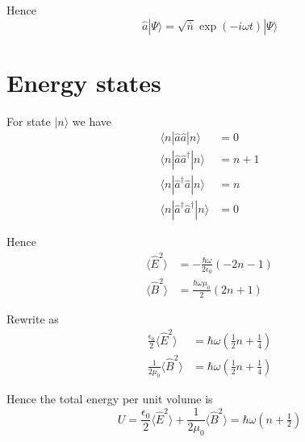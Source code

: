 \documentclass[12pt]{article}
\begin{document}
Hence
\begin{equation*}
\hat a|\Psi\rangle=\sqrt{\bar n}\exp(-i\omega t)|\Psi\rangle
\end{equation*}

\section*{Energy states}
For state $|n\rangle$ we have
\begin{align*}
\langle n|\hat a\hat a|n\rangle&=0
\\
\langle n|\hat a\hat a^\dag|n\rangle&=n+1
\\
\langle n|\hat a^\dag\hat a|n\rangle&=n
\\
\langle n|\hat a^\dag\hat a^\dag|n\rangle&=0
\end{align*}

Hence
\begin{align*}
\langle\hat E^2\rangle
&=-\frac{\hbar\omega}{2\epsilon_0}(-2n-1)
\\
\langle\hat B^2\rangle
&=\frac{\hbar\omega\mu_0}{2}(2n+1)
\end{align*}

Rewrite as
\begin{align*}
\frac{\epsilon_0}{2}\langle\hat E^2\rangle&=\hbar\omega\left(\tfrac{1}{2}n+\tfrac{1}{4}\right)
\\
\frac{1}{2\mu_0}\langle\hat B^2\rangle&=\hbar\omega\left(\tfrac{1}{2}n+\tfrac{1}{4}\right)
\end{align*}

Hence the total energy per unit volume is
\begin{equation*}
U=\frac{\epsilon_0}{2}\langle\hat E^2\rangle
+\frac{1}{2\mu_0}\langle\hat B^2\rangle
=\hbar\omega\left(n+\tfrac{1}{2}\right)
\end{equation*}
\end{document}

